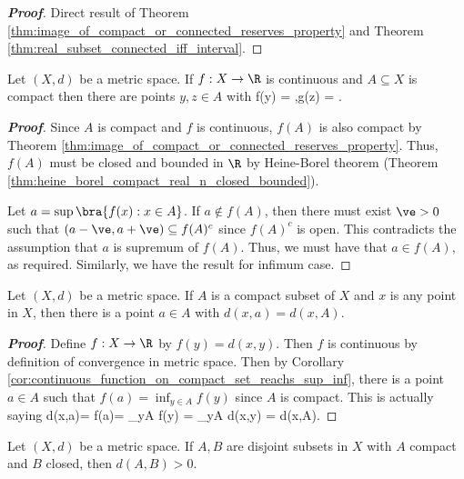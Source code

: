 \begin{proof}[\bf Proof]
Direct result of Theorem \ref{thm:image_of_compact_or_connected_reserves_property} and Theorem \ref{thm:real_subset_connected_iff_interval}.
\end{proof}



\begin{corollary}\label{cor:continuous_function_on_compact_set_reachs_sup_inf}
Let $(X,d)$ be a metric space. If $f:X\to \R$ is continuous and $A\subseteq X$ is compact then there are points $y,z \in A$ with
\be
f(y) = \sup{},\qquad g(z) = \inf{}.
\ee
\end{corollary}

\begin{proof}[\bf Proof]
Since $A$ is compact and $f$ is continuous, $f(A)$ is also compact by Theorem \ref{thm:image_of_compact_or_connected_reserves_property}. Thus, $f(A)$ must be closed and bounded in $\R$ by Heine-Borel theorem (Theorem \ref{thm:heine_borel_compact_real_n_closed_bounded}). 

Let $a = \sup\bra{f(x):x\in A}$. If $a\not\in f(A)$, then there must exist $\ve>0$ such that $(a-\ve,a+\ve)\subseteq f(A)^c$ since $f(A)^c$ is open. This contradicts the assumption that $a$ is supremum of $f(A)$. Thus, we must have that $a\in f(A)$, as required. Similarly, we have the result for infimum case.
\end{proof}

\begin{corollary}
Let $(X,d)$ be a metric space. If $A$ is a compact subset of $X$ and $x$ is any point in $X$, then there is a point $a \in A$ with $d(x,a) = d(x,A)$.
\end{corollary}

\begin{proof}[\bf Proof]
Define $f:X\to \R$ by $f(y) = d(x,y)$. Then $f$ is continuous by definition of convergence in metric space. Then by Corollary \ref{cor:continuous_function_on_compact_set_reachs_sup_inf}, there is a point $a\in A$ such that $f(a) = \inf_{y\in A} f(y)$ since $A$ is compact. This is actually saying
\be
d(x,a)= f(a)= \inf_{y\in A} f(y) = \inf_{y\in A} d(x,y) = d(x,A).
\ee
\end{proof}






\begin{theorem}\label{thm:compact_disjoint_sets_real_n_imples_distance_positive}
Let $(X,d)$ be a metric space. If $A,B$ are disjoint subsets in $X$ with $A$ compact and $B$ closed, then $d(A,B)>0$.
\end{theorem}


